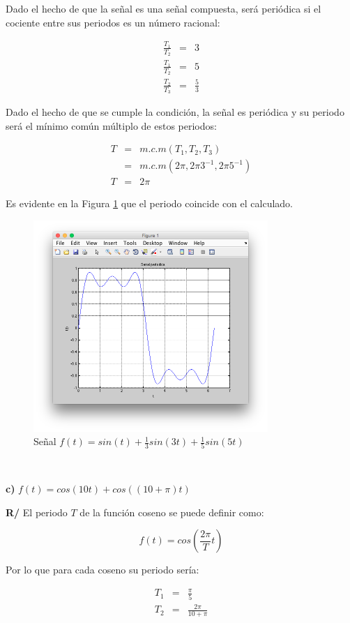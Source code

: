 \documentclass[twocolumn]{article}
\begin{document}
Dado el hecho de que la señal es una señal compuesta, será periódica si el cociente entre sus periodos es un número racional:

\begin{eqnarray*}
\frac{T_1}{T_2} &=& 3\\
\frac{T_1}{T_2} &=& 5\\
\frac{T_2}{T_3} &=& \frac{5}{3}
\end{eqnarray*}

Dado el hecho de que se cumple la condición, la señal es periódica y su periodo será el mínimo común múltiplo de estos periodos:

\begin{eqnarray*}
T &=& m.c.m(T_1,T_2,T_3)\\
&=& m.c.m(2 \pi,2\pi3^{-1},2\pi5^{-1})\\
T &=& 2\pi
\end{eqnarray*}

Es evidente en la Figura \ref{fig_5b} que el periodo coincide con el calculado.

\begin{figure}[!t]
\centering
\includegraphics[width=3.5in]{imgs/5b.png}
\caption{Señal $f(t) = sin(t) + \frac{1}{3}sin(3t) + \frac{1}{5}sin(5t)$}
\label{fig_5b}
\end{figure}

$\,$

\textbf{c)} $f(t) = cos(10t) + cos((10+\pi)t)$

\textbf{R/} El periodo $T$ de la función coseno se puede definir como:

$$f(t) = cos\left(\frac{2\pi}{T}t\right)$$

Por lo que para cada coseno su periodo sería:

\begin{eqnarray*}
T_1 &=& \frac{\pi}{5}\\
T_2 &=& \frac{2\pi}{10 + \pi}
\end{eqnarray*}
\end{document}
